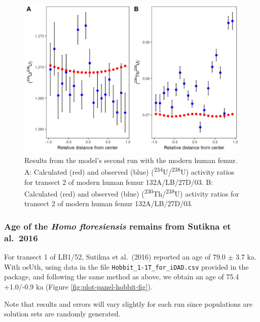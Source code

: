 \documentclass[]{elsarticle} %
\begin{document}
\begin{figure}
\includegraphics[width=1\linewidth]{figures/plot-panel-second-run-modern} \caption{Results from the model's second run with the modern human femur. A: Calculated (red) and observed (blue) (\textsuperscript{234}U/\textsuperscript{238}U) activity ratios for transect 2 of modern human femur 132A/LB/27D/03. B: Calculated (red) and observed (blue) (\textsuperscript{230}Th/\textsuperscript{238}U) activity ratios for transect 2 of modern human femur 132A/LB/27D/03.}\label{fig:plot-panel-second-run-modern-fig}
\end{figure}

\FloatBarrier

\hypertarget{age-of-the-homo-floresiensis-remains-from-sutikna-et-al.-2016}{%
\subsubsection{\texorpdfstring{Age of the \emph{Homo floresiensis} remains from Sutikna et al.~2016}{Age of the Homo floresiensis remains from Sutikna et al.~2016}}\label{age-of-the-homo-floresiensis-remains-from-sutikna-et-al.-2016}}

For transect 1 of LB1/52, Sutikna et al.~(2016) reported an age of 79.0 \(\pm\) 3.7 ka. With osUth, using data in the file \texttt{Hobbit\_1-1T\_for\_iDAD.csv} provided in the package, and following the same method as above, we obtain an age of 75.4 +1.0/-0.9 ka (Figure \ref{fig:plot-panel-hobbit-fig}).

Note that results and errors will vary slightly for each run since populations are solution sets are randomly generated.

\newpage
\end{document}
